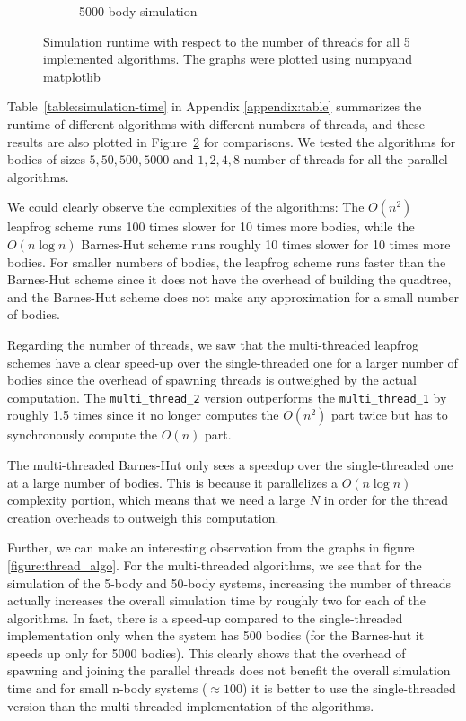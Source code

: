 \documentclass[12pt]{article}
\begin{document}
\begin{figure}[hbt!]
\begin{subfigure}[b]{0.41\textwidth}
        \caption{5000 body simulation}
        \label{figure:5000-body}
    \end{subfigure}
    \caption[hmm]{Simulation runtime with respect to the number of threads for all 5 implemented algorithms. The graphs were plotted using numpy\footnotemark and matplotlib \footnotemark}
    \label{figure:n-body}
\end{figure}

Table~\ref{table:simulation-time} in Appendix \ref{appendix:table} summarizes the runtime of different algorithms with different numbers of threads, and these results are also plotted in Figure~\ref{figure:n-body} for comparisons.
We tested the algorithms for bodies of sizes $5, 50, 500, 5000$ and $1, 2, 4, 8$ number of threads for all the parallel algorithms. 

We could clearly observe the complexities of the algorithms: The $O(n^2)$ leapfrog scheme runs 100 times slower for 10 times more bodies, while the $O(n \log n)$ Barnes-Hut scheme runs roughly 10 times slower for 10 times more bodies. For smaller numbers of bodies, the leapfrog scheme runs faster than the Barnes-Hut scheme since it does not have the overhead of building the quadtree, and the Barnes-Hut scheme does not make any approximation for a small number of bodies.

Regarding the number of threads, we saw that the multi-threaded leapfrog schemes have a clear speed-up over the single-threaded one for a larger number of bodies since the overhead of spawning threads is outweighed by the actual computation.
The \verb|multi_thread_2| version outperforms the \verb|multi_thread_1| by roughly 1.5 times since it no longer computes the $O(n^2)$ part twice but has to synchronously compute the $O(n)$ part.

The multi-threaded Barnes-Hut only sees a speedup over the single-threaded one at a large number of bodies. This is because it parallelizes a $O(n\log n)$ complexity portion, which means that we need a large $N$ in order for the thread creation overheads to outweigh this computation.

Further, we can make an interesting observation from the graphs in figure \ref{figure:thread_algo}. For the multi-threaded algorithms, we see that for the simulation of the 5-body and 50-body systems, increasing the number of threads actually increases the overall simulation time by roughly two for each of the algorithms. In fact, there is a speed-up compared to the single-threaded implementation only when the system has 500 bodies (for the Barnes-hut it speeds up only for 5000 bodies). This clearly shows that the overhead of spawning and joining the parallel threads does not benefit the overall simulation time and for small n-body systems ($\approx100$) it is better to use the single-threaded version than the multi-threaded implementation of the algorithms.
\end{document}
